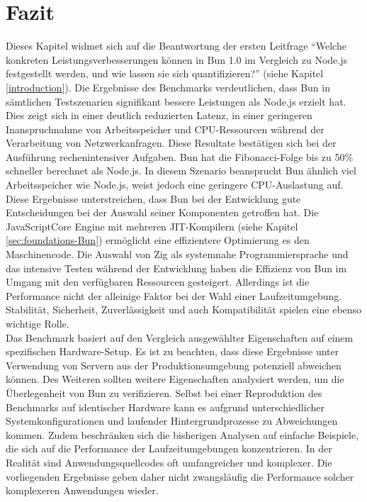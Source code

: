\section{Fazit} \label{sec:performance-conclusion}
Dieses Kapitel widmet sich auf die Beantwortung der ersten Leitfrage ``Welche konkreten Leistungsverbesserungen können in Bun 1.0 im Vergleich zu Node.js festgestellt werden, und wie lassen sie sich quantifizieren?'' (siehe Kapitel \ref{introduction}). Die Ergebnisse des Benchmarks verdeutlichen, dass Bun in sämtlichen Testszenarien signifikant bessere Leistungen als Node.js erzielt hat. Dies zeigt sich in einer deutlich reduzierten Latenz, in einer geringeren Inanspruchnahme von Arbeitsspeicher und CPU-Ressourcen während der Verarbeitung von Netzwerkanfragen. Diese Resultate bestätigen sich bei der Ausführung rechenintensiver Aufgaben. Bun hat die Fibonacci-Folge bis zu 50\% schneller berechnet als Node.js. In diesem Szenario beansprucht Bun ähnlich viel Arbeitsspeicher wie Node.js, weist jedoch eine geringere CPU-Auslastung auf. \newline
Diese Ergebnisse unterstreichen, dass Bun bei der Entwicklung gute Entscheidungen bei der Auswahl seiner Komponenten getroffen hat. Die JavaScriptCore Engine mit mehreren JIT-Kompilern (siehe Kapitel \ref{sec:foundations-Bun}) ermöglicht eine effizientere Optimierung es den Maschinencode. Die Auswahl von Zig als systemnahe Programmiersprache und das intensive Testen während der Entwicklung haben die Effizienz von Bun im Umgang mit den verfügbaren Ressourcen gesteigert. Allerdings ist die Performance nicht der alleinige Faktor bei der Wahl einer Laufzeitumgebung. Stabilität, Sicherheit, Zuverlässigkeit und auch Kompatibilität spielen eine ebenso wichtige Rolle.\\

\noindent
Das Benchmark basiert auf den Vergleich ausgewählter Eigenschaften auf einem spezifischen Hardware-Setup. Es ist zu beachten, dass diese Ergebnisse unter Verwendung von Servern aus der Produktionsumgebung potenziell abweichen können. Des Weiteren sollten weitere Eigenschaften analysiert werden, um die Überlegenheit von Bun zu verifizieren. Selbst bei einer Reproduktion des Benchmarks auf identischer Hardware kann es aufgrund unterschiedlicher Systemkonfigurationen und laufender Hintergrundprozesse zu Abweichungen kommen. \newline
Zudem beschränken sich die bisherigen Analysen auf einfache Beispiele, die sich auf die Performance der Laufzeitumgebungen konzentrieren. In der Realität sind Anwendungsquellcodes oft umfangreicher und komplexer. Die vorliegenden Ergebnisse geben daher nicht zwangsläufig die Performance solcher komplexeren Anwendungen wieder.\\

